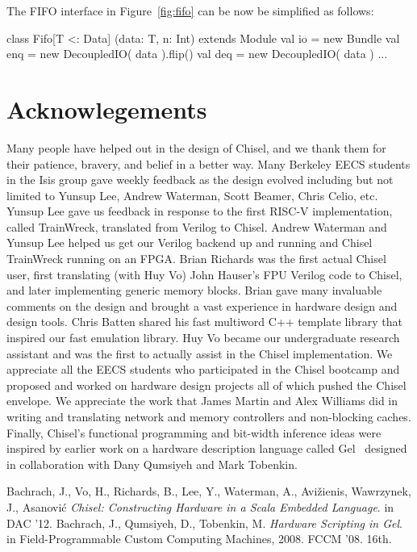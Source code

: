 \documentclass[twocolumn,10pt]{article}
\def\note#1{\noindent{\bf [Note: #1]}}
\begin{document}
\noindent
The FIFO interface in Figure~\ref{fig:fifo} can be now be simplified as
follows: 

\begin{scala}
class Fifo[T <: Data] (data: T, n: Int) 
    extends Module {
  val io = new Bundle {
    val enq = new DecoupledIO( data ).flip()
    val deq = new DecoupledIO( data )
  }
  ...
}
\end{scala}


\section{Acknowlegements}

Many people have helped out in the design of Chisel, and we thank them
for their patience, bravery, and belief in a better way.  Many
Berkeley EECS students in the Isis group gave weekly feedback as the
design evolved including but not limited to Yunsup Lee, Andrew
Waterman, Scott Beamer, Chris Celio, etc.  Yunsup Lee gave us feedback
in response to the first RISC-V implementation, called TrainWreck,
translated from Verilog to Chisel.  Andrew Waterman and Yunsup Lee
helped us get our Verilog backend up and running and Chisel TrainWreck
running on an FPGA.  Brian Richards was the first actual Chisel user,
first translating (with Huy Vo) John Hauser's FPU Verilog code to
Chisel, and later implementing generic memory blocks.  Brian gave many
invaluable comments on the design and brought a vast experience in
hardware design and design tools.  Chris Batten shared his fast
multiword C++ template library that inspired our fast emulation
library.  Huy Vo became our undergraduate research assistant and was
the first to actually assist in the Chisel implementation.  We
appreciate all the EECS students who participated in the Chisel
bootcamp and proposed and worked on hardware design projects all of
which pushed the Chisel envelope.  We appreciate the work that James
Martin and Alex Williams did in writing and translating network and
memory controllers and non-blocking caches.  Finally, Chisel's
functional programming and bit-width inference ideas were inspired by
earlier work on a hardware description language called Gel~\cite{gel} designed in
collaboration with Dany Qumsiyeh and Mark Tobenkin.


\begin{thebibliography}{50}
 Bachrach, J., Vo, H., Richards, B., Lee, Y., Waterman,
  A., Avi\v{z}ienis, Wawrzynek, J., Asanovi\'{c} \textsl{Chisel:
    Constructing Hardware in a Scala Embedded Language}.
in DAC '12.
 Bachrach, J., Qumsiyeh, D., Tobenkin, M. \textsl{Hardware Scripting in Gel}.
in Field-Programmable Custom Computing Machines, 2008. FCCM '08. 16th.
\end{thebibliography}
\end{document}
